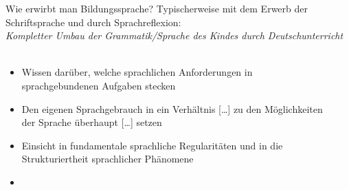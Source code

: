 \begin{frame}
  {Wie erwirbt man Bildungssprache?}
  \onslide<+->
  \onslide<+->
  Typischerweise mit dem Erwerb der \alert{Schriftsprache} und durch \alert{Sprachreflexion}:\\
  \textit{Kompletter Umbau der Grammatik\slash Sprache des Kindes durch Deutschunterricht}\\
    \\
  \Halbzeile
  \begin{itemize}[<+->]
    \item Wissen darüber, \alert{welche sprachlichen Anforderungen in\\
      sprachgebundenen Aufgaben stecken} 
    \item Den \alert{eigenen Sprachgebrauch} in ein Verhältnis [\ldots] zu den \alert{Möglichkeiten\\
      der Sprache überhaupt} [\ldots] setzen 
    \item Einsicht in fundamentale sprachliche Regularitäten und in die \alert{Strukturiertheit sprachlicher Phänomene} 
    \item {}
  \end{itemize}
  \Halbzeile
  \centering
  \onslide<+->
   
\end{frame}

